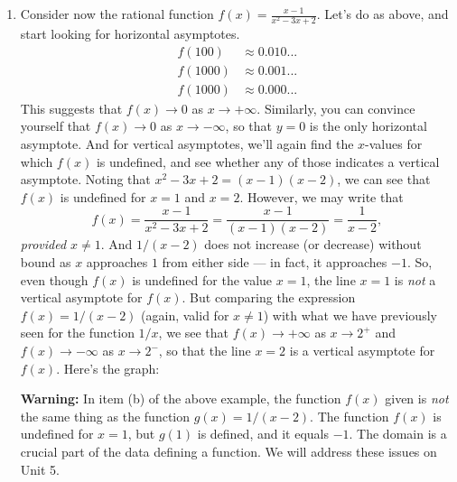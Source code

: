 \documentclass{ximera}
\begin{document}
\begin{example}
\begin{enumerate}
   \item Consider now the rational function $f(x) = \frac{x-1}{x^2-3x+2}$. Let's do as above, and start looking for horizontal asymptotes.
  \begin{align*}
    f(100) &\approx 0.010... \\
    f(1000) &\approx 0.001... \\
    f(1000) &\approx 0.000...
  \end{align*}
  This suggests that $f(x) \to 0$ as $x \to +\infty$. Similarly, you can convince yourself that $f(x) \to 0$ as $x \to -\infty$, so that $y=0$ is the only horizontal asymptote. And for vertical asymptotes, we'll again find the $x$-values for which $f(x)$ is undefined, and see whether any of those indicates a vertical asymptote. Noting that $x^2-3x+2 = (x-1)(x-2)$, we can see that $f(x)$ is undefined for $x=1$ and $x=2$. However, we may write that $$   f(x) = \frac{x-1}{x^2-3x+2} = \frac{x-1}{(x-1)(x-2)} = \frac{1}{x-2},  $$\emph{provided $x \neq 1$}. And $1/(x-2)$ does not increase (or decrease) without bound as $x$ approaches $1$ from either side --- in fact, it approaches $-1$. So, even though $f(x)$ is undefined for the value $x=1$, the line $x=1$ is \emph{not} a vertical asymptote for $f(x)$. But comparing the expression $f(x) = 1/(x-2)$ (again, valid for $x \neq 1$) with what we have previously seen for the function $1/x$, we see that $f(x) \to +\infty$ as $x \to 2^+$ and $f(x) \to -\infty$ as $x \to 2^-$, so that the line $x=2$ is a vertical asymptote for $f(x)$. Here's the graph:

      \begin{image}
      \end{image}

  \begin{callout}
    {\bf Warning:} In item (b) of the above example, the function $f(x)$ given is \emph{not} the same thing as the function $g(x) = 1/(x-2)$. The function $f(x)$ is undefined for $x=1$, but $g(1)$ is defined, and it equals $-1$. The domain is a crucial part of the data defining a function. We will address these issues on Unit 5. 
  \end{callout}
  \end{enumerate}
\end{example}
\end{document}
